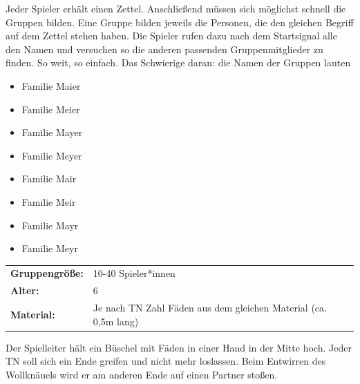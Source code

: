    
        Jeder Spieler erhält einen Zettel. Anschließend müssen sich möglichst schnell die Gruppen bilden. Eine Gruppe bilden jeweils die Personen, die den gleichen Begriff auf dem Zettel stehen haben. Die Spieler rufen dazu nach dem Startsignal alle den Namen und versuchen so die anderen passenden Gruppenmitglieder zu finden.    So weit, so einfach. Das Schwierige daran: die Namen der Gruppen lauten 
        \begin{itemize}
            \item Familie Maier
            \item Familie Meier 
            \item Familie Mayer
            \item Familie Meyer
            \item Familie Mair
            \item Familie Meir
            \item Familie Mayr
            \item Familie Meyr
        \end{itemize}
    



\newpage


\begin{table}[h]
\begin{tabular}{>{\bfseries}lp{8cm}}
   Gruppengröße:   & 10-40 Spieler*innen\\
    Alter: & 6\\
    Material: & Je nach TN Zahl Fäden aus dem gleichen Material (ca. 0,5m lang)\\
\end{tabular}
\end{table} 
Der Spielleiter hält ein Büschel mit Fäden in einer Hand in der Mitte hoch. Jeder TN soll sich ein Ende greifen und nicht mehr loslassen. Beim Entwirren des Wollknäuels wird er am anderen Ende auf einen Partner stoßen.\\





